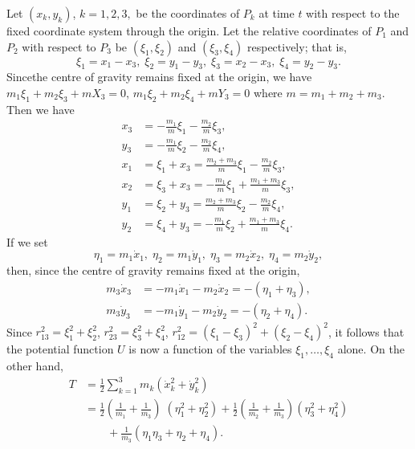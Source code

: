 Let $(x_k , y_k )$, $k =1,2,3,$ be the coordinates of $P_k$ at time
$t$ with respect to the fixed coordinate system through the
origin. Let the relative coordinates of $P_1$ and $P_2$ with respect
to $P_3$ be $(\xi_1, \xi_2)$ and $(\xi_3, \xi_4)$ respectively; that
is,  
\begin{equation*}
\xi_1 = x_1 - x_3, \; \xi_2  = y_1 - y_3, \; \xi_3 = x_2 - x_3, \; \xi_4 = y_2 - y_3. 
\tag{3.4.1}\label{chap3:eq3.4.1}
\end{equation*}
Since\pageoriginale the centre of gravity remains fixed at the origin,
we have $m_1 \xi_1 + m_2 \xi_3 + mX_3 = 0$, $m_1 \xi_2 + m_2 \xi_4 +
mY_3 = 0$ where $m = m_1 + m_2 + m_3$. Then we have 
\begin{align*}
x_3 &= - \frac{m_1}{m} \xi_1 -\frac{m_2}{m} \xi_3,\\ 
y_3 &= - \frac{m_1}{m} \xi_2 -\frac{m_2}{m} \xi_4,\\
x_1 &= \xi_1 + x_3 = \frac{m_2+m_3}{m} \xi_1 - \frac{m_2}{m}
\xi_3,\\ 
x_2 &= \xi_3 + x_3  =- \frac{m_1}{m} \xi_1 + \frac{m_1 + m_3}{m} \xi_3,\\
y_1 &= \xi_2 + y_3  = \frac{m_2 + m_3}{m} \xi_2 - \frac{m_2}{m}
\xi_4,\\ 
y_2 &= \xi_4 + y_3 = - \frac{m_1}{m} \xi_2 + \frac{m_1+ m_3}{m}
\xi_4. \tag{3.4.2}\label{chap3:eq3.4.2} 
\end{align*}
If we set
\begin{equation*}
\eta_1 = m_1 \dot{x}_1, \; \eta_2 = m_1 \dot{y}_1 , \; \eta_3 = m_2
\dot{x}_2, \; \eta_4 = m_2 \dot{y}_2, \tag{3.4.3}\label{chap3:eq3.4.3} 
\end{equation*}
then, since the centre of gravity remains fixed at the origin,
\begin{align*}
m_3 \dot{x}_3 & = - m_1 \dot{x}_1 - m_2 \dot{x}_2 = - (\eta_1 + \eta_3), \\
m_3 \dot{y}_3 & = - m_1 \dot{y}_1 - m_2 \dot{y}_2 = - (\eta_2 +
\eta_4). \tag{3.4.4}\label{chap3:eq3.4.4} 
\end{align*}
Since $r^2_{13} = \xi^2_1 + \xi^2_2$, $r^2_{23} = \xi^2_3  + \xi^2_4$,
$r^2_{12} = (\xi_1 - \xi_3)^2 + (\xi_2 - \xi_4)^2$, it follows that
the potential function $U$ is now a function of the variables $\xi_1,
\ldots, \xi_4$ alone. On the other hand,  
\begin{align*}
T & = \frac{1}{2} \sum\limits^3_{k=1} m_k(\dot{x}^2_k + \dot{y}^2_k)\\
& = \frac{1}{2} \left(\frac{1}{m_1} + \frac{1}{m_3} \right) \;
\left(\eta^2_1 + \eta^2_2 \right) + \frac{1}{2} \left(\frac{1}{m_2} +
\frac{1}{m_3} \right) \left(\eta^2_3 + \eta^2_4 \right)\\ 
&\qquad + \frac{1}{m_3} \left(\eta_1 \eta_3 + \eta_2 + \eta_4 \right). 
\end{align*}
